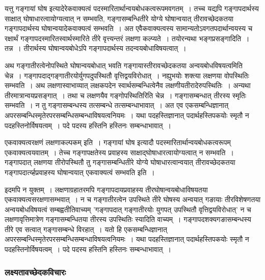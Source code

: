 				\begin{small}
				
					यत्तु गङ्गायां घोष इत्यादेरेकवाक्यत्वं पदस्मारितार्थान्वयबोधकत्वरूपमवगतम्~। तच्च यद्यपि गङ्गापदार्थस्य साक्षात् घोषाधारत्वायोग्यत्वात् न सम्भवति, गङ्गासम्बन्धितीरे योग्ये घोषान्वयात् तीरावच्छेदकतया गङ्गापदार्थस्य घोषान्वयादेकवाक्यत्वं सम्भवति~। अत एवैकवाक्यत्वस्य सामान्यतोऽवगतपदार्थान्वयस्य च रक्षार्थं गङ्गापदस्मारितस्वार्थस्मारिते तीरे वृत्त्यन्तरं लक्षणा कल्प्यते~। तयोरन्यथा भङ्गप्रसङ्गादिति~। तन्न~। तीरार्थस्य घोषान्वयबोधेऽपि  गङ्गापदार्थस्य तदन्वयबोधाविषयत्वात्~।
	
					अथ गङ्गातीरत्वेनोपस्थिते घोषान्वयबोधात् भवति गङ्गायास्तीरावच्छेदकतया अन्वयबोधविषयत्वमिति चेन्न~। गङ्गापदाद्गङ्गातीरयोर्युगपदुपस्थितौ वृत्तिद्वयविरोधात्~। नह्युभयोः शक्त्या लक्षणया वोपस्थितिः सम्भवति~। अथ लक्षणास्वाभाव्यात् लक्षकपदेन स्वार्थसम्बन्धित्वेनैव लक्षणीयतीरादेरुपस्थितिः~। अन्यथा तीरमात्रान्वयप्रसङ्गात्~। तथा च लक्षणयैव गङ्गोपस्थितिरिति चेन्न~। गङ्गासम्बन्धात् तीरस्य स्मृतिः सम्भवति~। न तु गङ्गासम्बन्धस्य तत्सम्बन्धे तत्सम्बन्धाभावात्~। अत एव एकसम्बन्धिज्ञानात् अपरसम्बन्धिस्मृतेरपरसम्बन्धिसम्बन्धाविषयत्वनियमः~। यथा पदहस्तिज्ञानात् पदार्थहस्तिपकयोः स्मृतौ न पदहस्तिनोर्विषयत्वम्~। पदे पदस्य हस्तिनि हस्तिनः सम्बन्धाभावात्~। 
				\end{small}

				एकवाक्यत्वरक्षणं लक्षणाकल्पकम् इति~। गङ्गायां घोष इत्यादौ पदस्मारितार्थान्वयबोधकत्वरूपम् एकवाक्यत्वयवातम्~। तेच्च गङ्गापक्षतेस्य प्रवाहस्य साक्षाद्घोषाधारत्वायोग्यत्वात् न सम्भवति~। गङ्गापदात् लक्षणया तीरोपस्थितौ तु गङ्गासम्बन्धितीरे योग्ये घोषाधारत्वान्वयात् तीरावच्छेदकतया गङ्गापदार्त्य्हप्रवाहस्य घोषान्वयात् एकवाक्यत्वं सम्भवति इति~।
			
				इदमपि न युक्तम्~। लक्षणाग्रहातरमपि गङ्गापदायप्रवाहस्य तीरघोषान्वयबोधाविषयतया एकवाक्यत्वसरक्षणासम्भवात्~। न च गङ्गातीरत्वेन उपस्थिते तीरे घोषस्य अन्वयात् गङायाः तीरविशेषणतया अन्वयबोधविषयत्वं सम्बह्वतीतिवाच्यम् ’गङ्गापदात् गङ्गातीरयोः युगपत् उपस्थितौ वृत्तिद्वयविरोधात्’ न च लक्षणावृत्तिमात्रेण गङ्गासम्बन्धितया तीरस्य उपस्थितिः स्यादिति वाच्यम्~। गङ्गापदशक्यगङासम्बन्धस्य तीरे एव सत्वात् गङ्गासम्बन्धे विरहात्~। यतो हि एकसम्बन्धिज्ञानात् अपरसम्बन्धिस्मृतेरपरसम्बन्धिसम्बन्धाविषयत्वनियमः~। यथा पदहस्तिज्ञानात् पदार्थहस्तिपकयोः स्मृतौ न पदहस्तिनोर्विषयत्वम्~। पदे पदस्य हस्तिनि हस्तिनः सम्बन्धाभावात्~। 

			\subsubsection{लक्ष्यतावच्छेदकविचारः}
				
